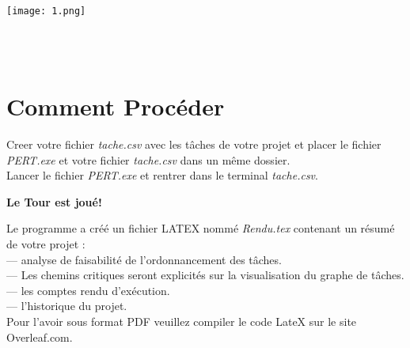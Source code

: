 \documentclass{article}
\begin{document}
\centerline{\texttt{[image: 1.png]}}
\\\\

\section{Comment Procéder}
Creer votre fichier \textit{tache.csv} avec les tâches de votre projet et placer le fichier \textit{PERT.exe} et votre fichier \textit{tache.csv} dans un même dossier.
\\
Lancer le fichier \textit{PERT.exe} et rentrer dans le terminal \textit{tache.csv}.
\\
\begin{flushleft}
    \bf
Le Tour est joué!
\end{flushleft}
Le programme a créé un fichier
LATEX nommé \textit{Rendu.tex} contenant un résumé de votre projet : 
\\
— analyse de faisabilité de l’ordonnancement des tâches.
\\
— Les chemins critiques seront explicités sur la visualisation du graphe de tâches.
\\
— les comptes rendu d’exécution.
\\
— l’historique du projet.
\\
Pour l'avoir sous format PDF veuillez compiler le code LateX sur le site Overleaf.com.
\end{document}
